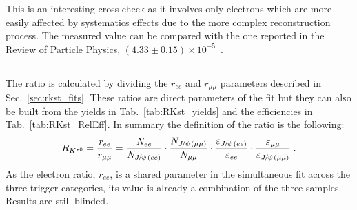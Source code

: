 This is an interesting cross-check as it involves only electrons which are more easily affected by systematics 
effects due to the more complex reconstruction process. The measured value can be compared with the one reported 
in the Review of Particle Physics, $(4.33 \pm 0.15) \times 10^{-5}$~\cite{PDG2014}.

%
%

\subsection{\RKst}

The \RKst ratio is calculated by dividing the $r_{ee}$ and $r_{\mu\mu}$
parameters described in Sec.~\ref{sec:rkst_fits}. These ratios are 
direct parameters of the fit but they can also be built from the yields
in Tab.~\ref{tab:RKst_yields} and the efficiencies in Tab.~\ref{tab:RKst_RelEff}.
In summary the definition of the \RKst ratio is the following:
%
\begin{equation}
\RKst = \frac{r_{ee}}{r_{\mu\mu}}  
= \frac{N_{ee}}{N_{\jpsi(ee)}} 
\cdot \frac{N_{\jpsi(\mu\mu)}}{N_{\mu\mu}}
\cdot \frac{\varepsilon_{\jpsi(ee)}}{\varepsilon_{ee}} 
\cdot \frac{\varepsilon_{\mu\mu}}{\varepsilon_{\jpsi(\mu\mu)}}\;.
\end{equation}
%
As the electron ratio, $r_{ee}$, is a shared parameter in the simultaneous fit across the
three trigger categories, its value is already a combination of the three samples.
Results are still blinded.




